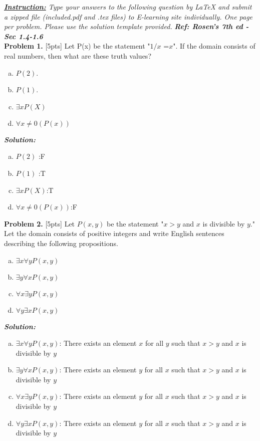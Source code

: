 \documentclass[10pt]{article}
\newcounter{problem}
\begin{document}
\pagestyle{fancyplain}
\textit{\textbf{\underline{Instruction:}} Type your answers to the following question by LaTeX and submit a zipped file (included.pdf and .tex files) to E-learning site individually. One page per problem. Please use the solution template provided.}
\textit{\textbf{Ref: Rosen's 7th ed - Sec 1.4-1.6}}\\
\textbf{Problem 1.} [5pts] Let P(x) be the statement "$1/x$ =$x$". If the domain consists of real numbers, then what are these truth values?\\
  \begin{enumerate}[a.]
    \item $P(2)$.
    \item $P(1)$.
    \item $\exists xP(X)$
    \item $\forall x\ne 0(P(x))$
  \end{enumerate}
\textit{\textbf{Solution:}}
  \begin{enumerate}[a.]
    \item $P(2)$ :F
    \item $P(1)$ :T
    \item $\exists xP(X)$:T
    \item $\forall x\ne 0(P(x))$:F
  \end{enumerate}
\clearpage
\textbf{Problem 2.} [5pts] Let $P(x,y)$ be the statement "$x>y$ and $x$ is divisible by $y$." Let the domain consists of positive integers and write English sentences describing the following propositions.
    \begin{enumerate}[a.]
      \item $\exists x \forall yP(x,y)$
      \item $\exists y \forall xP(x,y)$
      \item $\forall x \exists yP(x,y)$
      \item $\forall y \exists xP(x,y)$
    \end{enumerate}
\textit{\textbf{Solution:}}
    \begin{enumerate}[a.]
      \item $\exists x \forall yP(x,y)$: There exists an element $x$ for all $y$ such that $x>y$ and $x$ is divisible by $y$
      \item $\exists y \forall xP(x,y)$: There exists an element $y$ for all $x$ such that $x>y$ and $x$ is divisible by $y$
      \item $\forall x \exists yP(x,y)$: There exists an element $y$ for all $x$ such that $x>y$ and $x$ is divisible by $y$
      \item $\forall y \exists xP(x,y)$: There exists an element $y$ for all $x$ such that $x>y$ and $x$ is divisible by $y$
    \end{enumerate}
\end{document}
